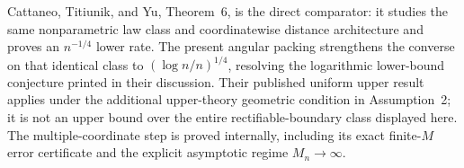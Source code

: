 Cattaneo, Titiunik, and Yu, Theorem~6, is the direct comparator: it studies the same nonparametric law class and coordinatewise distance architecture and proves an \(n^{-1/4}\) lower rate.  The present angular packing strengthens the converse on that identical class to \((\log n/n)^{1/4}\), resolving the logarithmic lower-bound conjecture printed in their discussion.  Their published uniform upper result applies under the additional upper-theory geometric condition in Assumption~2; it is not an upper bound over the entire rectifiable-boundary class displayed here.  The multiple-coordinate step is proved internally, including its exact finite-\(M\) error certificate and the explicit asymptotic regime \(M_n\to\infty\).